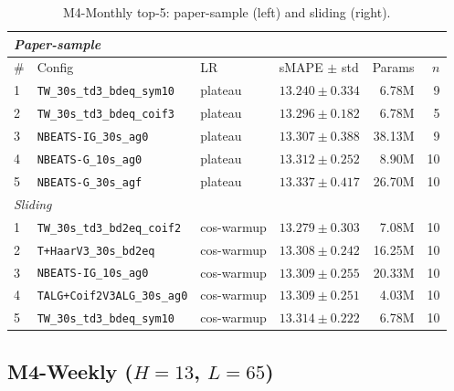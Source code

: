 \documentclass[11pt,a4paper]{article}
\begin{document}
\begin{table}[h]
\centering
\scriptsize
\setlength{\tabcolsep}{2.5pt}
\caption{M4-Monthly top-5: paper-sample (left) and sliding (right).}
\label{tab:m4_monthly_full}
\begin{tabular}{@{}llllrr@{}}
\toprule
\multicolumn{6}{l}{\textit{Paper-sample}} \\
\midrule
\# & Config & LR & sMAPE $\pm$ std & Params & $n$ \\
\midrule
1 & \texttt{TW\_30s\_td3\_bdeq\_sym10}      & plateau & $\mathbf{13.240 \pm 0.334}$ & 6.78M  & 9 \\
2 & \texttt{TW\_30s\_td3\_bdeq\_coif3}      & plateau & $13.296 \pm 0.182$          & 6.78M  & 5 \\
3 & \texttt{NBEATS-IG\_30s\_ag0}            & plateau & $13.307 \pm 0.388$          & 38.13M & 9 \\
4 & \texttt{NBEATS-G\_10s\_ag0}             & plateau & $13.312 \pm 0.252$          & 8.90M  & 10 \\
5 & \texttt{NBEATS-G\_30s\_agf}             & plateau & $13.337 \pm 0.417$          & 26.70M & 10 \\
\midrule
\multicolumn{6}{l}{\textit{Sliding}} \\
\midrule
1 & \texttt{TW\_30s\_td3\_bd2eq\_coif2}     & cos-warmup & $\mathbf{13.279 \pm 0.303}$ & 7.08M  & 10 \\
2 & \texttt{T+HaarV3\_30s\_bd2eq}           & cos-warmup & $13.308 \pm 0.242$          & 16.25M & 10 \\
3 & \texttt{NBEATS-IG\_10s\_ag0}            & cos-warmup & $13.309 \pm 0.255$          & 20.33M & 10 \\
4 & \texttt{TALG+Coif2V3ALG\_30s\_ag0}      & cos-warmup & $13.309 \pm 0.251$          & 4.03M  & 10 \\
5 & \texttt{TW\_30s\_td3\_bdeq\_sym10}      & cos-warmup & $13.314 \pm 0.222$          & 6.78M  & 10 \\
\bottomrule
\end{tabular}
\end{table}

\subsection{\texorpdfstring{M4-Weekly ($H=13$, $L=65$)}{M4-Weekly (H=13, L=65)}}
\end{document}
